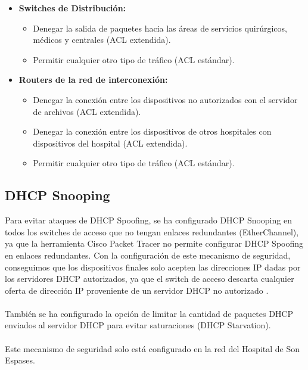 \begin{itemize}
\begin{itemize}
    \end{itemize}
    \item \textbf{Switches de Distribución:}
    \begin{itemize}
        \item Denegar la salida de paquetes hacia las áreas de servicios quirúrgicos, médicos y centrales (ACL extendida).
        \item Permitir cualquier otro tipo de tráfico (ACL estándar).
    \end{itemize}
    \item \textbf{Routers de la red de interconexión:}
    \begin{itemize}
        \item Denegar la conexión entre los dispositivos no autorizados con el servidor de archivos (ACL extendida).
        \item Denegar la conexión entre los dispositivos de otros hospitales con dispositivos del hospital (ACL extendida).
        \item Permitir cualquier otro tipo de tráfico (ACL estándar).
    \end{itemize}
\end{itemize}

\subsection{DHCP Snooping}
Para evitar ataques de DHCP Spoofing, se ha configurado DHCP Snooping en todos los switches de acceso que no tengan enlaces redundantes (EtherChannel), ya que la herramienta Cisco Packet Tracer no permite 
configurar DHCP Spoofing en enlaces redundantes. Con la configuración de este mecanismo de seguridad, conseguimos que los dispositivos finales solo acepten las direcciones IP dadas por los servidores DHCP autorizados, 
ya que el switch de acceso descarta cualquier oferta de dirección IP proveniente de un servidor DHCP no autorizado \cite{cisco_dhcp_snooping}.
\\ \\
También se ha configurado la opción de limitar la cantidad de paquetes DHCP enviados al servidor DHCP para evitar saturaciones (DHCP Starvation).
\\ \\
Este mecanismo de seguridad solo está configurado en la red del Hospital de Son Espases.

